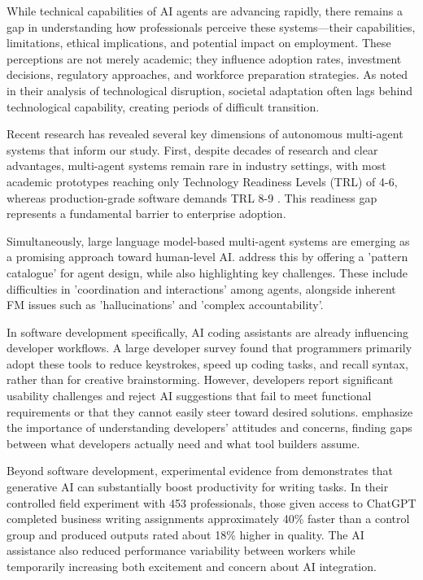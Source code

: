 \documentclass{article}
\begin{document}
While technical capabilities of AI agents are advancing rapidly, there
remains a gap in understanding how professionals perceive these
systems---their capabilities, limitations, ethical implications, and
potential impact on employment. These perceptions are not merely
academic; they influence adoption rates, investment decisions,
regulatory approaches, and workforce preparation strategies. As \cite{Brynjolfsson2014} noted in their analysis of technological
disruption, societal adaptation often lags behind technological
capability, creating periods of difficult transition.

Recent research has revealed several key dimensions of autonomous
multi-agent systems that inform our study. First, despite decades of
research and clear advantages, multi-agent systems remain rare in
industry settings, with most academic prototypes reaching only
Technology Readiness Levels (TRL) of 4-6, whereas production-grade
software demands TRL 8-9 \citep{Wrona2023}. This readiness gap
represents a fundamental barrier to enterprise adoption.

Simultaneously, large language model-based multi-agent systems are
emerging as a promising approach toward human-level AI. \cite{liu2024} address this by offering a 'pattern catalogue' for agent design, while also highlighting key challenges. These include difficulties in 'coordination and interactions' among agents, alongside inherent FM issues such as 'hallucinations' and 'complex accountability'.

In software development specifically, AI coding assistants are already
influencing developer workflows. A large developer survey \cite{ICSESurvey2024} found that programmers primarily adopt these tools to reduce keystrokes, speed up coding tasks, and recall syntax, rather than for creative brainstorming. However, developers report significant usability challenges and reject AI suggestions that fail to meet functional requirements or that they cannot easily steer toward desired solutions. \cite{KhemkaHouck2024} emphasize the importance of understanding developers' attitudes and concerns, finding gaps between what developers actually need and what tool builders assume.

Beyond software development, experimental evidence from \cite{NoyZhang2023} demonstrates that generative AI can substantially boost
productivity for writing tasks. In their controlled field experiment
with 453 professionals, those given access to ChatGPT completed business
writing assignments approximately 40\% faster than a control group and
produced outputs rated about 18\% higher in quality. The AI assistance
also reduced performance variability between workers while temporarily
increasing both excitement and concern about AI integration.
\end{document}
